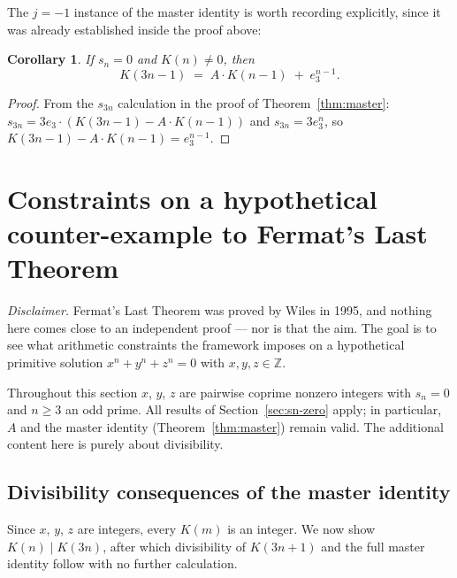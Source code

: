 \documentclass[12pt]{article}
\newtheorem{corollary}[theorem]{Corollary}
\theoremstyle{definition}
\begin{document}
	The $j = -1$ instance of the master identity is worth recording explicitly,
	since it was already established inside the proof above:
	
	\begin{corollary}
		\label{cor:K3n-1}
		If $s_n = 0$ and $K(n) \neq 0$, then
		\[
		K(3n-1) \;=\; A \cdot K(n-1) \;+\; e_3^{n-1}.
		\]
	\end{corollary}
	\begin{proof}
		From the $s_{3n}$ calculation in the proof of Theorem~\ref{thm:master}:
		$s_{3n} = 3e_3 \cdot (K(3n-1) - A \cdot K(n-1))$ and $s_{3n} = 3e_3^n$,
		so $K(3n-1) - A \cdot K(n-1) = e_3^{n-1}$.
	\end{proof}
	
	\section{Constraints on a hypothetical counter-example to Fermat's Last Theorem}
	\label{sec:flt}
	
	\noindent\textit{Disclaimer.}
	Fermat's Last Theorem was proved by Wiles in 1995, and nothing here
	comes close to an independent proof --- nor is that the aim.  The goal
	is to see what arithmetic constraints the framework imposes on a
	hypothetical primitive solution $x^n + y^n + z^n = 0$ with
	$x, y, z \in \mathbb{Z}$.
	
	\medskip
	Throughout this section $x$, $y$, $z$ are pairwise coprime nonzero
	integers with $s_n = 0$ and $n \geq 3$ an odd prime.  All results of
	Section~\ref{sec:sn-zero} apply; in particular, $A$ and the master identity (Theorem~\ref{thm:master}) remain valid.  The additional content here is purely about divisibility.
	
	\subsection{Divisibility consequences of the master identity}
	
	Since $x$, $y$, $z$ are integers, every $K(m)$ is an integer.
	We now show $K(n) \mid K(3n)$, after which divisibility of $K(3n+1)$
	and the full master identity follow with no further calculation.
	
\end{document}
